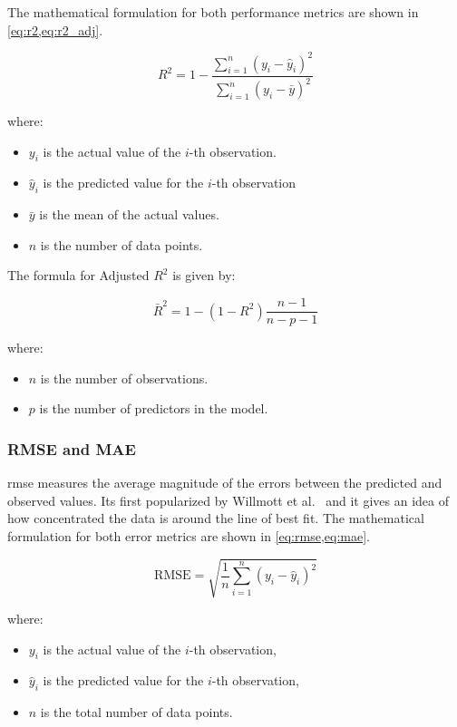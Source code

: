 The mathematical formulation for both performance metrics are shown in \cref{eq:r2,eq:r2_adj}.

\begin{equation}
    R^2 = 1 - \frac{\sum_{i=1}^{n} (y_i - \hat{y}_i)^2}{\sum_{i=1}^{n} (y_i - \bar{y})^2}
\label{eq:r2}
\end{equation}

where:
\begin{itemize}
    \item \(y_i\) is the actual value of the \(i\)-th observation.
    \item \(\hat{y}_i\) is the predicted value for the \(i\)-th observation
    \item \(\bar{y}\) is the mean of the actual values.
    \item \(n\) is the number of data points.
\end{itemize}
\clearpage
The formula for Adjusted \(R^2\) is given by:

\begin{equation}
    \bar{R}^2 = 1 - \left(1 - R^2\right) \frac{n-1}{n-p-1}
\label{eq:r2_adj}
\end{equation}

where:
\begin{itemize}
    \item \(n\) is the number of observations.
    \item \(p\) is the number of predictors in the model.
\end{itemize}

\subsubsection{RMSE and MAE}\label{sec:rmse_and_mae}
\ac{rmse} measures the average magnitude of the errors between the predicted and observed values. 
Its first popularized by Willmott et al.~\citep{willmott1985rmse} and it gives an idea of how concentrated the 
data is around the line of best fit. The mathematical formulation for both error metrics are shown in \cref{eq:rmse,eq:mae}.

\begin{equation}
    \text{RMSE} = \sqrt{\frac{1}{n} \sum_{i=1}^{n} (y_i - \hat{y}_i)^2}
    \label{eq:rmse}
\end{equation}

where:
\begin{itemize}
    \item \(y_i\) is the actual value of the \(i\)-th observation,
    \item \(\hat{y}_i\) is the predicted value for the \(i\)-th observation,
    \item \(n\) is the total number of data points.
\end{itemize}

